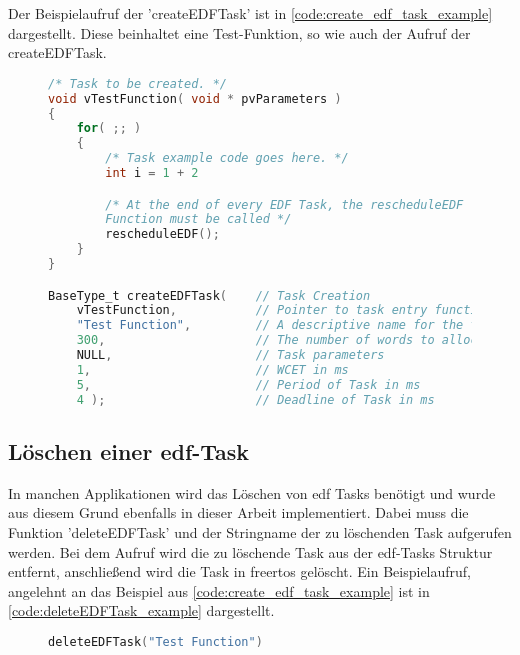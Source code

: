 \documentclass[../EDF Master Thesis.tex]{subfiles}
\begin{document}
    Der Beispielaufruf der 'createEDFTask' ist in \autoref{code:create_edf_task_example} dargestellt.
    Diese beinhaltet eine Test-Funktion, so wie auch der Aufruf der createEDFTask.

\begin{figure}[ht!]
\begin{lstlisting}[language=C, caption=createEDFTask Beispiel, label=code:create_edf_task_example]
/* Task to be created. */
void vTestFunction( void * pvParameters )
{
    for( ;; )
    {
        /* Task example code goes here. */
        int i = 1 + 2

        /* At the end of every EDF Task, the rescheduleEDF
        Function must be called */
        rescheduleEDF();
    }
}

BaseType_t createEDFTask(    // Task Creation
    vTestFunction,           // Pointer to task entry function
    "Test Function",         // A descriptive name for the task
    300,                     // The number of words to allocate
    NULL,                    // Task parameters 
    1,                       // WCET in ms
    5,                       // Period of Task in ms
    4 );                     // Deadline of Task in ms
\end{lstlisting}
\end{figure}

\clearpage

\subsection{Löschen einer \acf{edf}-Task} \label{section:löschen_einer_edf_task}

    In manchen Applikationen wird das Löschen von \ac{edf} Tasks benötigt und wurde aus diesem Grund ebenfalls in dieser Arbeit implementiert.
    Dabei muss die Funktion 'deleteEDFTask' und der Stringname der zu löschenden Task aufgerufen werden.
    Bei dem Aufruf wird die zu löschende Task aus der \ac{edf}-Tasks Struktur entfernt, anschließend wird die Task in \ac{freertos} gelöscht.
    Ein Beispielaufruf, angelehnt an das Beispiel aus \autoref{code:create_edf_task_example} ist in \autoref{code:deleteEDFTask_example} dargestellt.

\begin{figure}[ht!]
\begin{lstlisting}[language=C, caption=deleteEDFTask Beispiel, label=code:deleteEDFTask_example]
    deleteEDFTask("Test Function")
\end{lstlisting}
\end{figure}
\end{document}

